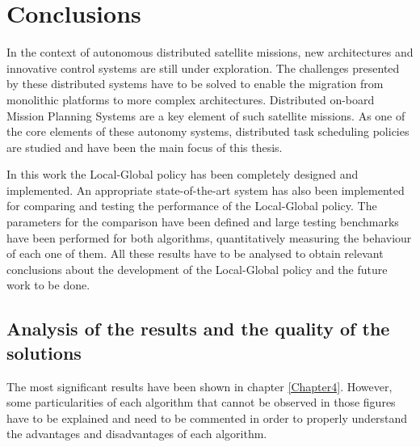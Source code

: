 
\chapter{Conclusions} %

\label{Chapter5} %


In the context of autonomous distributed satellite missions, new architectures and innovative control systems are still under exploration. The challenges presented by these distributed systems have to be solved to enable the migration from monolithic platforms to more complex architectures. Distributed on-board Mission Planning Systems are a key element of such satellite missions. As one of the core elements of these autonomy systems, distributed task scheduling policies are studied and have been the main focus of this thesis.

In this work the Local-Global policy has been completely designed and implemented. An appropriate state-of-the-art system has also been implemented for comparing and testing the performance of the Local-Global policy. The parameters for the comparison have been defined and large testing benchmarks have been performed for both algorithms, quantitatively measuring the behaviour of each one of them. All these results have to be analysed to obtain relevant conclusions about the development of the Local-Global policy and the future work to be done.

\section{Analysis of the results and the quality of the solutions}

The most significant results have been shown in chapter \ref{Chapter4}. However, some particularities of each algorithm that cannot be observed in those figures have to be explained and need to be commented in order to properly understand the advantages and disadvantages of each algorithm.

